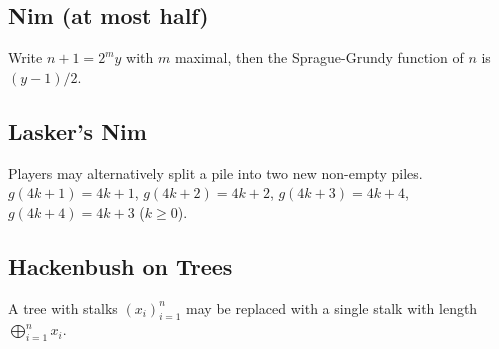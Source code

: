 {    \subsection{Nim (at most half)}
    Write $n+1 = 2^my$ with $m$ maximal, then the Sprague-Grundy function of $n$ is $(y - 1) / 2$.
    \subsection{Lasker's Nim}
    Players may alternatively split a pile into two new non-empty piles. $g(4k+1) = 4k+1$, $g(4k+2) = 4k+2$, $g(4k+3) = 4k+4$, $g(4k+4) = 4k+3$ ($k\geq 0$).
    \subsection{Hackenbush on Trees}
    A tree with stalks $(x_i)_{i=1}^n$ may be replaced with a single stalk with length $\bigoplus_{i=1}^n x_i$.

	}

